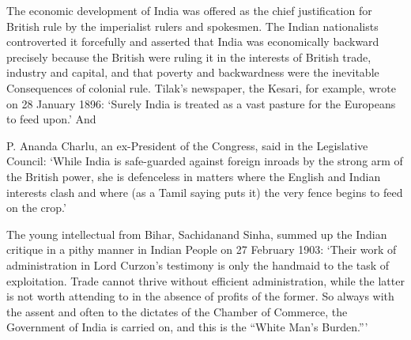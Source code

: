 \begin{multicols}{2}
The economic development of India was offered as the chief justification for British rule by the imperialist rulers and spokesmen. The Indian nationalists controverted it forcefully and asserted that India was economically backward precisely because the British were ruling it in the interests of British trade, industry and capital, and that poverty and backwardness were the inevitable Consequences of colonial rule. Tilak's newspaper, the Kesari, for example, wrote on 28 January 1896: `Surely India is treated as a vast pasture for the Europeans to feed upon.' And

P. Ananda Charlu, an ex-President of the Congress, said in the Legislative Council: `While India is safe-guarded against foreign inroads by the strong arm of the British power, she is defenceless in matters where the English and Indian interests clash and where (as a Tamil saying puts it) the very fence begins to feed on the crop.'

The young intellectual from Bihar, Sachidanand Sinha, summed up the Indian critique in a pithy manner in Indian People on 27 February 1903: `Their work of administration in Lord Curzon's testimony is only the handmaid to the task of exploitation. Trade cannot thrive without efficient administration, while the latter is not worth attending to in the absence of profits of the former. So always with the assent and often to the dictates of the Chamber of Commerce, the Government of India is carried on, and this is the ``White Man's Burden.'''


\end{multicols}
